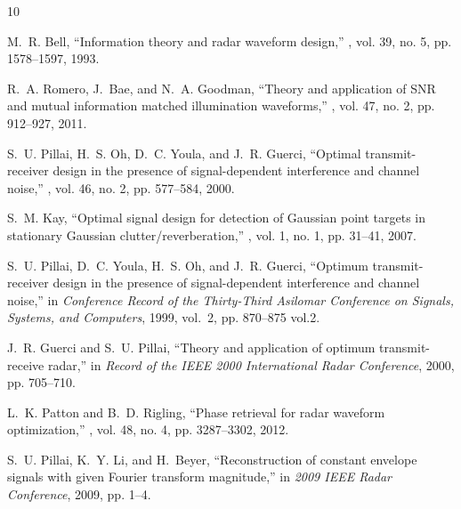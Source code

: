 \documentclass{article}
\begin{document}

\begin{thebibliography}{10}

M.~R. Bell,
\newblock ``Information theory and radar waveform design,''
, vol. 39, no. 5, pp.
  1578--1597, 1993.

R.~A. {Romero}, J.~{Bae}, and N.~A. {Goodman},
\newblock ``Theory and application of {SNR} and mutual information matched
  illumination waveforms,''
, vol. 47,
  no. 2, pp. 912--927, 2011.

S.~U. Pillai, H.~S. Oh, D.~C. Youla, and J.~R. Guerci,
\newblock ``Optimal transmit-receiver design in the presence of
  signal-dependent interference and channel noise,''
, vol. 46, no. 2, pp.
  577--584, 2000.

S.~M. Kay,
\newblock ``Optimal signal design for detection of {G}aussian point targets in
  stationary {G}aussian clutter/reverberation,''
, vol. 1,
  no. 1, pp. 31--41, 2007.

S.~U. {Pillai}, D.~C. {Youla}, H.~S. {Oh}, and J.~R. {Guerci},
\newblock ``Optimum transmit-receiver design in the presence of
  signal-dependent interference and channel noise,''
\newblock in {\em Conference Record of the Thirty-Third Asilomar Conference on
  Signals, Systems, and Computers}, 1999, vol.~2, pp. 870--875 vol.2.

J.~R. {Guerci} and S.~U. {Pillai},
\newblock ``Theory and application of optimum transmit-receive radar,''
\newblock in {\em Record of the IEEE 2000 International Radar Conference},
  2000, pp. 705--710.

L.~K. {Patton} and B.~D. {Rigling},
\newblock ``Phase retrieval for radar waveform optimization,''
, vol. 48,
  no. 4, pp. 3287--3302, 2012.

S.~U. {Pillai}, K.~Y. {Li}, and H.~{Beyer},
\newblock ``Reconstruction of constant envelope signals with given {F}ourier
  transform magnitude,''
\newblock in {\em 2009 IEEE Radar Conference}, 2009, pp. 1--4.


\end{thebibliography}
\end{document}
